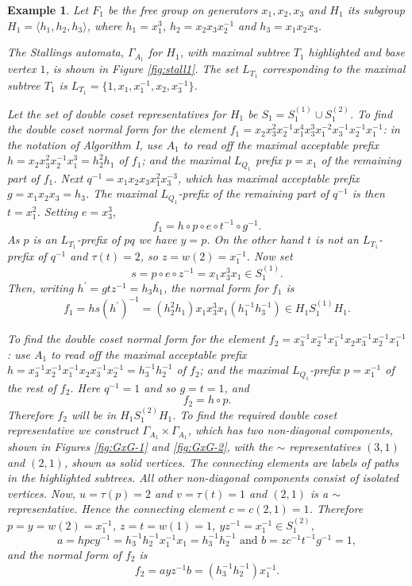 \documentclass[a4paper,12pt]{article}
\newcommand{\G}{\Gamma }
\renewcommand{\t}{\tau }
\newtheorem{exam}[theorem]{Example}
\newenvironment{example}{\begin{exam} \rm}{\end{exam}}
\numberwithin{equation}{section}
\numberwithin{figure}{section}
\newcommand{\la}{\langle}
\newcommand{\ra}{\rangle}
\begin{document}
\begin{example}\label{ex:f_1}
Let $F_1$ be the free group on generators $x_1,x_2,x_3$ and $H_1$ its
subgroup $H_1=\la
h_1,h_2,h_3\ra$, where  $h_1= x_1^3$, $h_2=x_2x_3x_2^{-1}$ and
$h_3=x_1x_2x_3$.

The Stallings automata, $\G_{A_1}$ for $H_1$,
with maximal subtree $T_1$ highlighted and base vertex $1$, is shown
in Figure %
 \ref{fig:stall1}.
The set $L_{T_1}$ corresponding to the maximal subtree  $T_1$ is
 $L_{T_1}=\{1,x_1,x_1^{-1},x_2,x_3^{-1} \}$.

Let the set of double coset representatives for $H_1$ be $S_1=S_1^{(1)}
\cup S_1^{(2)}$.
To find the double coset normal form for the element $f_1 =
x_2x_3^2x_2^{-1} x_1^4x_3^3x_1^{-2}x_3^{-1}x_2^{-1}x_1^{-1}$: in
the notation of Algorithm I, use
${A_1}$ to read off the maximal acceptable prefix $h=x_2x_3^2x_2^{-1} x_1^3
=h_2^2h_1$
of $f_1$; and
the maximal $L_{Q_1}$ prefix $p=x_1$ of the remaining part of $f_1$. Next
$q^{-1}=x_1x_2x_3x_1^2x_3^{-3}$, which has maximal acceptable prefix
$g=x_1x_2x_3=h_3$. The maximal $L_{Q_1}$-prefix of the remaining part of $q^{-1}$
is then $t=x_1^2$. Setting $e=x_3^3$,
\[f_1=h\circ p\circ e\circ t^{-1}\circ g^{-1}.\]
As $p$ is an $L_{T_1}$-prefix of $pq$ we have $y=p$. On the other hand
$t$ is not an $L_{T_1}$-prefix of $q^{-1}$ and $\t(t)=2$, so $z=w(2)=x_1^{-1}$.
Now set
\[s=p\circ e\circ z^{-1}=x_1x_3^3x_1\in S_1^{(1)}.\]
Then, writing $h^\prime=gtz^{-1}=h_3h_1$, the normal form for $f_1$ is
\[f_1=hs(h^\prime)^{-1}=(h_2^{2}h_1) x_1x_3^3x_1(h_1^{-1}h_3^{-1})\in H_1S_1^{(1)}H_1.\]

To find the double coset normal form for the element
$f_2=x_3^{-1}x_2^{-1}x_1^{-1}x_2x_3^{-1}x_2^{-1}x_1^{-1}$: use
${A_1}$ to read off the maximal acceptable prefix
$h=x_3^{-1}x_2^{-1}x_1^{-1}x_2x_3^{-1}x_2^{-1}=h_3^{-1}h_2^{-1}$
of $f_2$;
and  the
maximal $L_{Q_1}$-prefix $p=x_1^{-1}$ of the rest of $f_2$.  Here
$q^{-1}=1$ and so $g=t=1$, and
\[f_2=h\circ p.\]
Therefore $f_2$ will be in $H_1S_1^{(2)}H_1$. To find the required
double coset representative we construct $\G_{A_1}\times
\G_{A_1}$, which has two non-diagonal components, shown in Figures
\ref{fig:GxG-1} and \ref{fig:GxG-2},
with the $\sim$ representatives $(3,1)$ and $(2,1)$,  shown as
solid vertices. The connecting elements are labels of paths in the
highlighted subtrees.  All other non-diagonal components consist
of isolated vertices. Now, $u=\t(p)=2$ and $v=\t(t)=1$ and $(2,1)$
is a $\sim$ representative. Hence the  connecting element
$c=c(2,1)=1$. Therefore $p=y=w(2)=x_1^{-1}$, $z=t=w(1)=1$,
$yz^{-1}=x_1^{-1}\in S_1^{(2)}$,
\[a=hpcy^{-1}=h_3^{-1}h_2^{-1}x_1^{-1}x_1=h_3^{-1}h_2^{-1}
\textrm{ and }
b=zc^{-1}t^{-1}g^{-1}=1,\]
and the normal form of $f_2$ is
\[f_2=a yz^{-1} b=(h_3^{-1}h_2^{-1}) x_1^{-1}.\]
\end{example}
\end{document}
